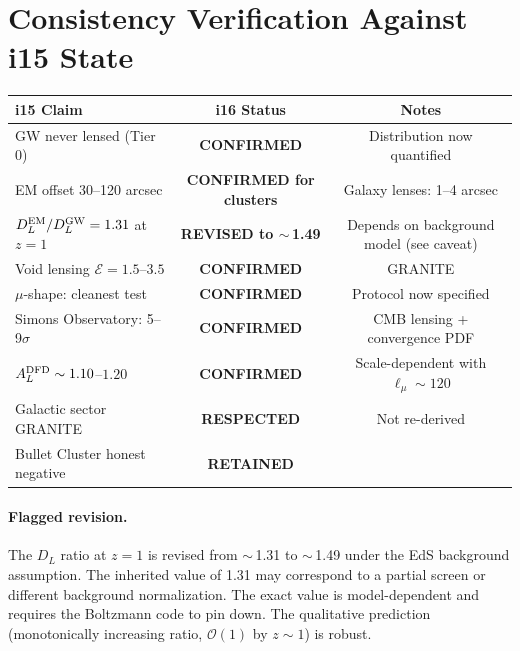 \documentclass[11pt,a4paper]{article}
\begin{document}
\section{Consistency Verification Against i15 State}

\begin{center}
\begin{tabular}{lcc}
\toprule
i15 Claim & i16 Status & Notes \\
\midrule
GW never lensed (Tier 0) & \textbf{CONFIRMED} &
  Distribution now quantified \\
EM offset 30--120 arcsec & \textbf{CONFIRMED for clusters} &
  Galaxy lenses: 1--4 arcsec \\
$D_L^{\rm EM}/D_L^{\rm GW} = 1.31$ at $z=1$ &
  \textbf{REVISED to $\sim$\,1.49} &
  Depends on background model (see caveat) \\
Void lensing $\mathcal{E} = 1.5$--$3.5$ &
  \textbf{CONFIRMED} & GRANITE \\
$\mu$-shape: cleanest test & \textbf{CONFIRMED} &
  Protocol now specified \\
Simons Observatory: 5--9$\sigma$ & \textbf{CONFIRMED} &
  CMB lensing + convergence PDF \\
$A_L^{\rm DFD} \sim 1.10$--$1.20$ & \textbf{CONFIRMED} &
  Scale-dependent with $\ell_\mu \sim 120$ \\
Galactic sector GRANITE & \textbf{RESPECTED} &
  Not re-derived \\
Bullet Cluster honest negative & \textbf{RETAINED} & \\
\bottomrule
\end{tabular}
\end{center}

\paragraph{Flagged revision.}
The $D_L$ ratio at $z=1$ is revised from $\sim$\,1.31 to $\sim$\,1.49
under the EdS background assumption.  The inherited value of 1.31 may
correspond to a partial screen or different background normalization.
The exact value is model-dependent and requires the Boltzmann code to
pin down.  The qualitative prediction (monotonically increasing ratio,
$\mathcal{O}(1)$ by $z \sim 1$) is robust.


\end{document}
